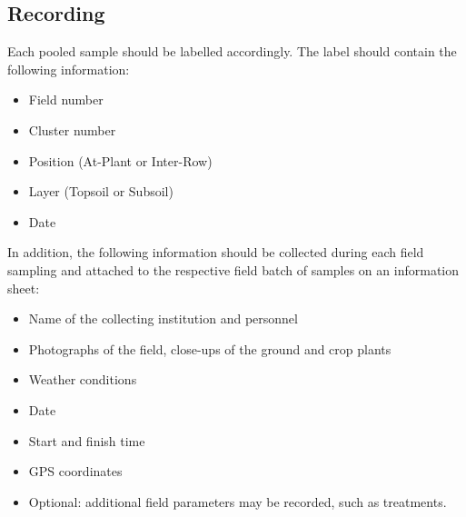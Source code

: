 \begin{refsection}
\subsection*{Recording}

Each pooled sample should be labelled accordingly. The label should contain the following information:

\begin{itemize}
\item Field number
\item Cluster number
\item Position (At-Plant or Inter-Row)
\item Layer (Topsoil or Subsoil)
\item Date
\end{itemize}

In addition, the following information should be collected during each field sampling and attached to the respective field batch of samples on an information sheet:
\begin{itemize}
\item Name of the collecting institution and personnel
\item Photographs of the field, close-ups of the ground and crop plants
\item Weather conditions
\item Date
\item Start and finish time
\item GPS coordinates
\item Optional: additional field parameters may be recorded, such as treatments.
\end{itemize}

\clearpage
\end{refsection} %
